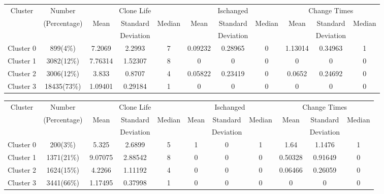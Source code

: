 \begin{table}[htbp]
\vspace{0.5em}\centering\wuhao
\begin{tabular}{ccccccccccc}
\toprule[1.5pt]
\multirow{3}{*}{Cluster}&{Number}&\multicolumn{3}{c}{Clone Life}&\multicolumn{3}{c}{Ischanged}&\multicolumn{3}{c}{Change Times} \\
&(Percentage)&\multirow{2}{*}{Mean}& Standard &\multirow{2}{*}{Median}&\multirow{2}{*}{Mean}&Standard &\multirow{2}{*}{Median}&\multirow{2}{*}{Mean}&Standard &\multirow{2}{*}{Median}\\
&&&  Deviation&&& Deviation&&& Deviation&\\ 
\midrule[1pt]
Cluster 0&899(4\%)&7.2069&2.2993&7&0.09232&0.28965&0&1.13014&0.34963&1\\ 
Cluster 1&3082(12\%)&7.76314&1.52307&8&0&0&0	&0&0&0\\ 
Cluster 2&3006(12\%)&3.833&0.8707&4&0.05822&0.23419	&0	&0.0652&0.24692&0\\ 
Cluster 3&18435(73\%)&1.09401&0.29184	&1	&0	&0	&0	&0	&0	&0\\ 
\bottomrule[1.5pt]
\end{tabular}
\end{table}

\begin{table}[htbp]
\vspace{0.5em}\centering\wuhao
\begin{tabular}{ccccccccccc}
\toprule[1.5pt]
\multirow{3}{*}{Cluster}&{Number}&\multicolumn{3}{c}{Clone Life}&\multicolumn{3}{c}{Ischanged}&\multicolumn{3}{c}{Change Times} \\
&(Percentage)&\multirow{2}{*}{Mean}& Standard &\multirow{2}{*}{Median}&\multirow{2}{*}{Mean}&Standard &\multirow{2}{*}{Median}&\multirow{2}{*}{Mean}&Standard &\multirow{2}{*}{Median}\\
&&&  Deviation&&& Deviation&&& Deviation&\\ 
\midrule[1pt]
Cluster 0&	200(3\%)	&5.325	&2.6899	&5	&1	&0	&1	&1.64	&1.1476	&1\\ 
Cluster 1&	1371(21\%)	&9.07075	&2.88542	&8	&0	&0	&0	&0.50328	&0.91649	&0\\ 
Cluster 2&	1624(15\%)	&4.2266	&1.11192	&4	&0	&0	&0	&0.06466	&0.26059	&0\\ 
Cluster 3&	3441(66\%)	&1.17495	&0.37998	&1	&0	&0	&0	&0	&0	&0\\ 
\bottomrule[1.5pt]
\end{tabular}
\end{table}

